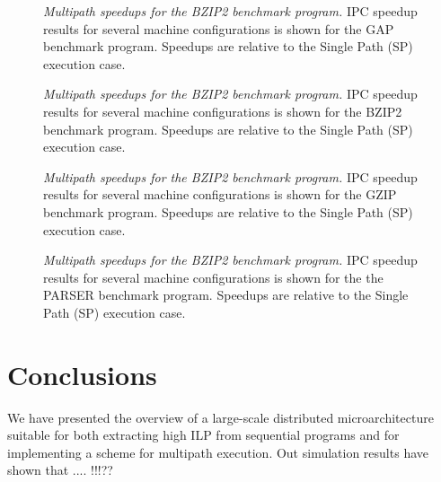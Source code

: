 \documentclass[10pt,dvips]{article}
\begin{document}
\begin{figure}
\centering
{}
\caption{{\em Multipath speedups for the BZIP2 benchmark program.} 
IPC speedup results for several machine configurations is shown for 
the GAP benchmark program.
Speedups are relative to the Single Path (SP) execution case.}
\label{fig:gap}
\end{figure}

\begin{figure}
\centering
{}
\caption{{\em Multipath speedups for the BZIP2 benchmark program.} 
IPC speedup results for several machine configurations is shown for 
the BZIP2 benchmark program.
Speedups are relative to the Single Path (SP) execution case.}
\label{fig:bzip2}
\end{figure}

\begin{figure}
\centering
{}
\caption{{\em Multipath speedups for the BZIP2 benchmark program.} 
IPC speedup results for several machine configurations is shown for 
the GZIP benchmark program.
Speedups are relative to the Single Path (SP) execution case.}
\label{fig:gzip}
\end{figure}

\begin{figure}
\centering
{}
\caption{{\em Multipath speedups for the BZIP2 benchmark program.} 
IPC speedup results for several machine configurations is shown for 
the the PARSER benchmark program.
Speedups are relative to the Single Path (SP) execution case.}
\label{fig:parser}
\end{figure}



%
\section{Conclusions}
%
We have presented the overview of a large-scale distributed 
microarchitecture suitable for both extracting high ILP from
sequential programs and for implementing a scheme for
multipath execution.
Out simulation results have shown that .... !!!??




\end{document}
